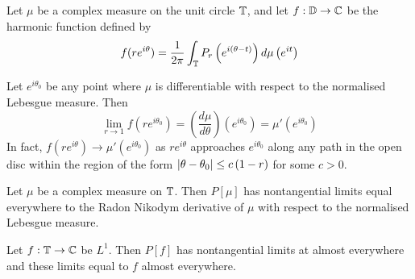 \begin{theorem}
    Let $\mu$ be a complex measure on the unit circle $\mathbb T$, and let $f: \mathbb D \to \mathbb C$ be the harmonic function defined by
    \begin{align*}
	f(re^{i\theta}) = \frac{1}{2\pi} \int_{\mathbb T} P_{r} \left( e^{i\left( \theta-t \right)} \right) d\mu \left( e^{it} \right)
    \end{align*}

    Let $e^{i\theta_{0}}$ be any point where $\mu$ is differentiable with respect to the normalised Lebesgue measure. Then
    \begin{equation*}
	\lim_{r\to 1} f\left( re^{i\theta_{0}} \right) = \left( \frac{d\mu}{d\theta} \right) \left( e^{i\theta _{0}} \right) = \mu ' \left( e^{i\theta _{0}} \right)
    \end{equation*}
    In fact, $f(re^{i\theta}) \to \mu ' \left( e^{i\theta_{0}} \right)$ as $re^{i\theta}$ approaches $e^{i\theta_{0}}$ along any path in the open disc within the region of the form $\left\lvert \theta - \theta_{0} \right\rvert \le c \left( 1-r \right)$ for some $c> 0$. 
    \label{thm:Fatou-1906}
\end{theorem}

\begin{corollary}
    Let $\mu$ be a complex measure on $\mathbb T$. Then $P[\mu]$ has nontangential limits equal everywhere to the Radon Nikodym derivative of $\mu$ with respect to the normalised Lebesgue measure.
\end{corollary}

\begin{corollary}
    Let $f : \mathbb T \to \mathbb C$ be $L^{1}$. Then $P[f]$ has nontangential limits at almost everywhere and these limits equal to $f$ almost everywhere.
    \label{cor:L1-implies-Poisson-limits}
\end{corollary}

